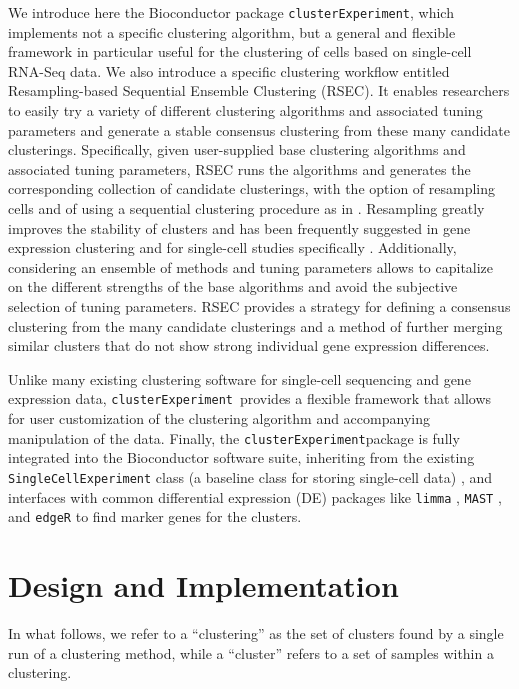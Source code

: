 \documentclass[10pt,letterpaper]{article}
\newcommand{\f}[1]{\texttt{#1}}
\newcommand{\CE}{\f{clusterExperiment}}
\begin{document}
We introduce here the Bioconductor package \CE, which implements not a specific clustering algorithm, but a general and flexible framework in particular useful for the clustering of cells based on single-cell RNA-Seq data. We also introduce a specific clustering workflow entitled Resampling-based Sequential Ensemble Clustering (RSEC). It enables researchers to easily try a variety of different clustering algorithms and associated tuning parameters and generate a stable consensus clustering from these many candidate clusterings. Specifically, given user-supplied base clustering algorithms and associated tuning parameters, RSEC runs the algorithms and generates the corresponding collection of candidate clusterings, with the option of resampling cells and of using a sequential clustering procedure as in \cite{Tseng:2005ir}. Resampling greatly improves the stability of clusters and has been frequently suggested in gene expression clustering \cite{Monti:2003p658} and for single-cell studies specifically \cite{Kiselev:2017jc}. Additionally, considering an ensemble of methods and tuning parameters allows to capitalize on the different strengths of the base algorithms and avoid the subjective selection of tuning parameters. RSEC provides a strategy for defining a consensus clustering from the many candidate clusterings and a method of further merging similar clusters that do not show strong individual gene expression differences. 

Unlike many existing clustering software for single-cell sequencing and gene expression data, \CE \ provides a flexible framework that allows for user customization of the clustering algorithm and accompanying manipulation of the data. Finally, the \CE package is fully integrated into the Bioconductor software suite, inheriting from the existing \f{SingleCellExperiment} class (a baseline class for storing single-cell data) \cite{singlecellexperiment}, and interfaces with common differential expression (DE) packages like \texttt{limma} \cite{Smyth:2005fk}, \texttt{MAST} \cite{Finak:2015id}, and \texttt{edgeR} \cite{Robinson:2010cw} to find marker genes for the clusters. 


\section{Design and Implementation}
\label{sec:methods}

In what follows, we refer to a ``clustering'' as the set of clusters found by a single run of a clustering method, while a ``cluster'' refers to a set of samples within a clustering.
\end{document}
